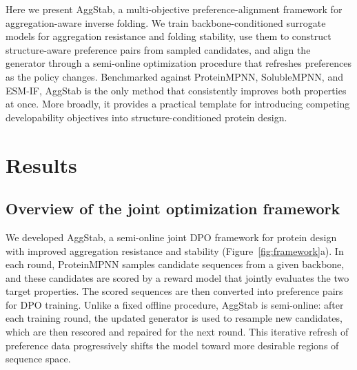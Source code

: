\documentclass[pdflatex,sn-mathphys-num]{sn-jnl}%
\theoremstyle{thmstyleone}%
\theoremstyle{thmstyletwo}%
\theoremstyle{thmstylethree}%
\begin{document}
Here we present AggStab, a multi-objective preference-alignment framework for aggregation-aware inverse folding. We train backbone-conditioned surrogate models for aggregation resistance and folding stability, use them to construct structure-aware preference pairs from sampled candidates, and align the generator through a semi-online optimization procedure that refreshes preferences as the policy changes. Benchmarked against ProteinMPNN, SolubleMPNN, and ESM-IF, AggStab is the only method that consistently improves both properties at once. More broadly, it provides a practical template for introducing competing developability objectives into structure-conditioned protein design.

\section{Results}\label{sec2}
\subsection{Overview of the joint optimization framework}
We developed AggStab, a semi-online joint DPO framework for protein design with improved aggregation resistance and stability (Figure~\ref{fig:framework}a). In each round, ProteinMPNN samples candidate sequences from a given backbone, and these candidates are scored by a reward model that jointly evaluates the two target properties. The scored sequences are then converted into preference pairs for DPO training. Unlike a fixed offline procedure, AggStab is semi-online: after each training round, the updated generator is used to resample new candidates, which are then rescored and repaired for the next round. This iterative refresh of preference data progressively shifts the model toward more desirable regions of sequence space.

\FloatBarrier
\end{document}
